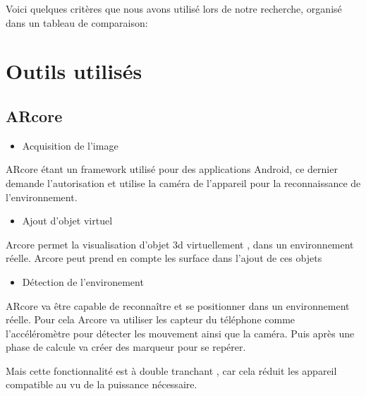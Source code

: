 \documentclass[12pt]{article}
\begin{document}
\par
Voici quelques critères que nous avons utilisé lors de notre recherche, organisé dans un tableau de comparaison:


\section{Outils utilisés}
	\subsection{ARcore}
		\begin{itemize}
			\item Acquisition de l'image
		\end{itemize}
		\par
		ARcore étant un framework utilisé pour des applications Android, ce dernier demande l’autorisation et utilise la caméra de l’appareil pour la reconnaissance de l'environnement.

		\begin{itemize}
			\item Ajout d'objet virtuel
		\end{itemize}
		\par
		Arcore permet la visualisation d’objet 3d virtuellement , dans un environnement réelle. Arcore peut prend en compte les surface dans l’ajout de ces objets

		\begin{itemize}
			\item Détection de l'environement
		\end{itemize}
		\par
		ARcore va être capable de reconnaître et se positionner dans un environnement réelle. Pour cela Arcore va utiliser les capteur du téléphone comme l'accéléromètre pour détecter les mouvement ainsi que la caméra. Puis après une phase de calcule va créer des marqueur pour se repérer.
		\par
		Mais cette fonctionnalité est à double tranchant , car cela réduit les appareil compatible au vu de la puissance nécessaire.
\end{document}
